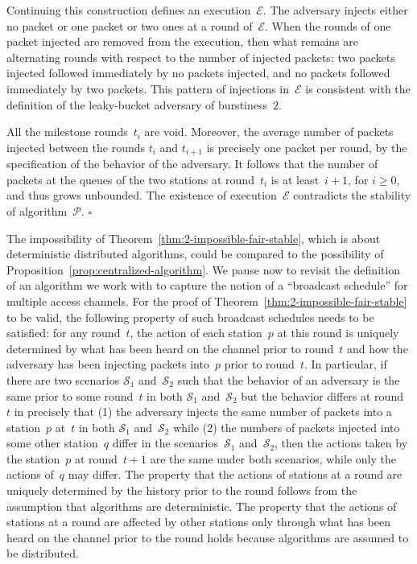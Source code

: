\documentclass[11pt]{article}
\newcommand{\cE}{\mathcal{E}}
\newcommand{\cP}{\mathcal{P}}
\newcommand{\cS}{\mathcal{S}}
\newcommand{\qed}{\hfill $\square$ \smallbreak}
\newenvironment{proof}{\noindent{\bf Proof:}}{\qed}
\begin{document}
\begin{proof}
Continuing this construction defines an execution~$\cE$.
The adversary injects either no packet or one packet or two ones at a round of~$\cE$.
When the rounds of one packet injected are removed from the execution, then what remains are alternating rounds with respect to the number of injected packets: two packets injected followed immediately by no packets injected, and no packets followed immediately by two packets.
This pattern of injections in~$\cE$ is consistent with the definition of the leaky-bucket adversary of burstiness~$2$.

All the milestone rounds~$t_i$ are void.
Moreover, the average number of packets injected between the rounds $t_i$ and $t_{i+1}$ is precisely one packet per round, by the specification of the behavior of the adversary.
It follows that the number of packets at the queues of the two stations at round~$t_{i}$ is at least~$i+1$, for $i \ge 0$, and thus grows unbounded.
The existence of execution~$\cE$ contradicts the stability of algorithm~$\cP$.
\end{proof}

The impossibility of Theorem~\ref{thm:2-impossible-fair-stable}, which is about deterministic distributed algorithms, could be compared to the possibility of Proposition~\ref{prop:centralized-algorithm}.
We pause now to revisit the definition of an algorithm we work with to capture the notion of a ``broadcast schedule'' for multiple access channels.
For the proof of Theorem~\ref{thm:2-impossible-fair-stable} to be valid, the following property of such broadcast schedules needs to be satisfied: for any round~$t$, the action of each station~$p$ at this round is uniquely determined by what has been heard on the channel prior to round~$t$ and how the adversary has been injecting packets into~$p$ prior to round~$t$.
In particular, if there are two scenarios $\cS_1$ and~$\cS_2$ such that the behavior of an adversary is the same prior to some round~$t$ in both $\cS_1$ and~$\cS_2$ but the behavior differs at round~$t$ in precisely that (1) the adversary injects the same number of packets into a station~$p$ at~$t$ in both $\cS_1$ and~$\cS_2$ while (2) the numbers of packets injected into some other station~$q$ differ in the scenarios~$\cS_1$ and~$\cS_2$, then the actions taken by the station~$p$ at round~$t+1$ are the same under both scenarios, while only the actions of~$q$ may differ.
The property that the actions of stations at a round are uniquely determined by the history prior to the round follows from the assumption that algorithms are deterministic.
The property that the actions of stations at a round are affected by other stations only through what has been heard on the channel prior to the round holds because algorithms are assumed to be distributed.
\end{document}
